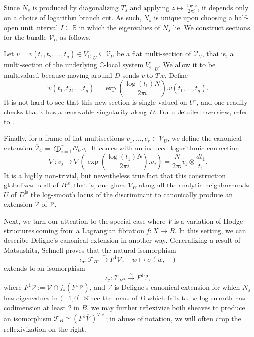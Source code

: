 \documentclass[12pt]{amsart}
\newcommand{\R}{\mathbb{R}}
\newcommand{\C}{\mathbb{C}}
\newcommand{\cT}{\mathcal{T}}
\newcommand{\cV}{\mathcal{V}}
\newcommand{\ol}{\overline}
\newcommand{\wt}{\widetilde}
\theoremstyle{definition}
\numberwithin{equation}{section}
\begin{document}
Since \(N_s\) is produced by diagonalizing \(T_s\) and applying 
\(z \mapsto \frac{\log z}{2\pi i}\), it depends only on a choice of logarithm branch cut.
As such, \(N_s\) is unique upon choosing a half-open unit interval \(I \subseteq \R\) 
in which the eigenvalues of \(N_s\) lie. We construct sections for the bundle 
\(\ol{\cV}_U\) as follows.

Let \(v = v(t_1, t_2, \dots, t_g) \in V_\C|_U \subseteq \cV_U\) be a flat multi-section of
\(\cV_U\), that is, a multi-section of the underlying \(\C\)-local system \(V_\C|_U\). We allow it
to be multivalued because moving around \(D\) sends \(v\) to \(T.v\). Define 
\begin{equation*}
    \wt{v}(t_1, t_2, \dots, t_g) =
    \exp\left(\frac{\log(t_1) N}{2\pi i}\right).v(t_1, \dots, t_g).
\end{equation*}
It is not hard to see that this new section is single-valued on \(U^\circ\), and 
one readily checks that \(\wt{v}\) has a removable singularity along \(D\). For a 
detailed overview, refer to \cite{cattani16}.

Finally, for a frame of flat multisections \(v_1, \dots, v_r \in \cV_U\), we define
the canonical extension \(\ol{\cV}_U = \bigoplus_{i=1}^r \mathcal{O}_U \wt{v}_i\).
It comes with an induced logarithmic connection 
\begin{equation*}
    \nabla: \wt{v}_j \mapsto \nabla \left(\exp\left(\frac{\log(t_1) N}{2\pi i}\right). v_j\right)
    = \frac{N}{2\pi i} \wt{v}_j \otimes \frac{dt_1}{t_1}.
\end{equation*}
It is a highly non-trivial, but nevertheless true fact that this construction 
globalizes to all of \(B^\mathrm{ls}\); that is, one glues \(\ol{\cV}_U\) along all the
analytic neighborhoods \(U\) of \(D^\mathrm{ls}\) the log-smooth locus of the 
discriminant to canonically produce an extension \(\ol{\cV}\) of \(\cV\).



Next, we turn our attention to the special case where \(V\) is a variation of Hodge 
structures coming from a Lagrangian fibration \(f: X \to B\). In this setting, we can describe 
Deligne's canonical extension in another way. Generalizing a result of Matsushita, 
Schnell \cite[\S 4]{schnell23} proves that the natural isomorphism 
\begin{equation*}
    \iota_{\sigma}: \cT_{B^\circ} \xrightarrow{\sim} F^1 \cV, \quad 
    w \mapsto \sigma(w, -)
\end{equation*}
extends to an isomorphism 
\begin{equation*}
    \iota_{\sigma}: \cT_{B^\mathrm{ls}} \xrightarrow{\sim} F^1 \ol{\cV},
\end{equation*}
where \(F^1 \ol{\cV} := \ol{\cV} \cap j_*(F^1 \cV)\), and \(\ol{\cV}\) is 
Deligne's canonical extension for which \(N_s\) has eigenvalues 
in \((-1, 0]\). Since the locus of \(D\) which fails to be log-smooth 
has codimension at least 2 in \(B\), we may further reflexivize both sheaves 
to produce an isomorphism \(\cT_B \simeq (F^1 \ol{\cV})^{\vee \vee}\); in 
abuse of notation, we will often drop the reflexivization on the right.
\end{document}
